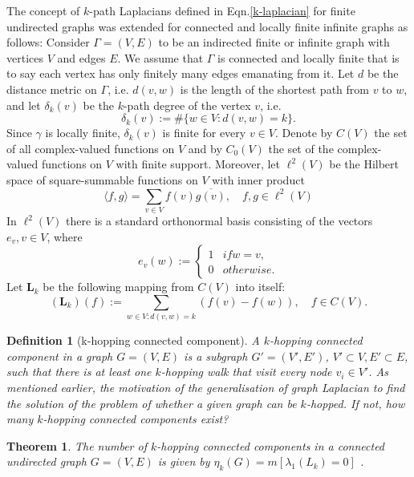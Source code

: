 \documentclass[10pt,a4paper]{article}
\newtheorem{thm}{Theorem}
\newtheorem{defn}{Definition}
\begin{document}
    	    The concept of $k$-path Laplacians defined in Eqn.\ref{k-laplacian} for finite undirected graphs was extended for connected and locally finite infinite graphs as follows:
    	    Consider $\Gamma = (V,E)$ to be an indirected finite or infinite graph with vertices $V$ and edges $E$. We assume that $\Gamma$ is connected and locally finite that is to say each vertex has only finitely many edges emanating from it. Let $d$ be the distance metric on $\Gamma$, i.e. $d(v,w)$ is the length of the shortest path from $v$ to $w$, and let $\delta_{k}(v)$ be the $k$-path degree of the vertex $v$, i.e.
    	    \begin{equation}
    	    \delta_{k}(v) := \#\{w \in V : d(v,w) = k\}.
    	    \end{equation}
    	    Since $\gamma$ is locally finite, $\delta_{k}(v)$ is finite for every $v \in V$. Denote by $C(V)$ the set of all complex-valued functions on $V$ and by $C_{0}(V)$ the set of the complex-valued functions on $V$ with finite support. Moreover, let $\ell^2(V)$ be the Hilbert space of square-summable functions on $V$ with inner product
    	    \begin{equation}
    	    \langle f,g\rangle = \sum_{v\in V} f(v) \overline{g(v)}, \quad f,g \in \ell^2(V) 
    	    \end{equation}
    	    In $\ell^2(V)$ there is a standard orthonormal basis consisting of the vectors $e_v, v\in V$, where
    	    \begin{equation}
    	    e_v(w) :=  \begin{cases*}
    	    1 & if  w = v,  \\
    	    0 & otherwise.
    	    \end{cases*}
    	    \end{equation}
    	    Let $\mathbf{L}_{k}$ be the following mapping from $C(V)$ into itself:
    	    \begin{equation}
    	    (\mathbf{L}_{k}) (f) := \sum_{w\in V: d(v,w)=k} (f(v) -f(w)), \quad f \in C(V).
    	    \label{infinite-dif}
    	    \end{equation}
    	    
    	    
    	    \begin{defn}[k-hopping connected component]
    	    	A $k$-hopping connected component in a graph $G=(V,E)$ is a subgraph $G' = (V',E')$, $V'\subset V,E' \subset E$, such that there is at least one $k$-hopping walk that visit every node $v_i \in V'$.
    	    	As mentioned earlier, the motivation of the generalisation of graph Laplacian to find the solution of the problem of whether a given graph can be $k$-hopped. If not, how many $k$-hopping connected components exist?\\
    	    \end{defn}
    	    \begin{thm}
    	    	The number of $k$-hopping connected components in a connected undirected graph $G=(V,E)$ is given by $\eta_k(G) = m[\lambda_1(L_k)=0]$ \citep{estrada2012path}.\\
    	    \end{thm}
        
\end{document}

